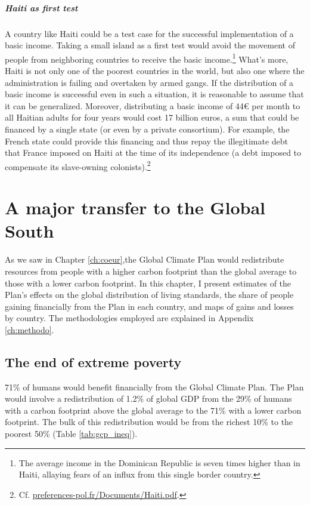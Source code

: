 \documentclass[a5paper,english,openany]{memoir}
\begin{document}
\paragraph{Haiti as first test}
A country like Haiti could be a test case for the successful implementation of a basic income. Taking a small island as a first test would avoid the movement of people from neighboring countries to receive the basic income.\footnote{The average income in the Dominican Republic is seven times higher than in Haiti, allaying fears of an influx from this single border country.} What's more, Haiti is not only one of the poorest countries in the world, but also one where the administration is failing and overtaken by armed gangs. If the distribution of a basic income is successful even in such a situation, it is reasonable to assume that it can be generalized. Moreover, distributing a basic income of 44\euro{} per month to all Haitian adults for four years would cost 17 billion euros, a sum that could be financed by a single state (or even by a private consortium). %
For example, the French state could provide this financing and thus repay the illegitimate debt that France imposed on Haiti at the time of its independence (a debt imposed to compensate its slave-owning colonists).\footnote{Cf. \href{http://preferences-pol.fr/Documents/Haïti.pdf}{preferences-pol.fr/Documents/Haiti.pdf}.}%


\chapter{A major transfer to the Global South\label{ch:effets_distributifs}}

As we saw in Chapter \ref{ch:coeur},the Global Climate Plan would redistribute resources from people with a higher carbon footprint than the global average to those with a lower carbon footprint. In this chapter, I present estimates of the Plan's effects on the global distribution of living standards, the share of people gaining financially from the Plan in each country, and maps of gains and losses by country. The methodologies employed are explained in Appendix \ref{ch:methodo}.

\section{The end of extreme poverty}\label{sec:fin_pauvrete}

71\% of humans would benefit financially from the Global Climate Plan. The Plan would involve a redistribution of 1.2\% of global GDP from the 29\% of humans with a carbon footprint above the global average to the 71\% with a lower carbon footprint. The bulk of this redistribution would be from the richest 10\% to the poorest 50\% (Table \ref{tab:gcp_ineq}). 
\end{document}
